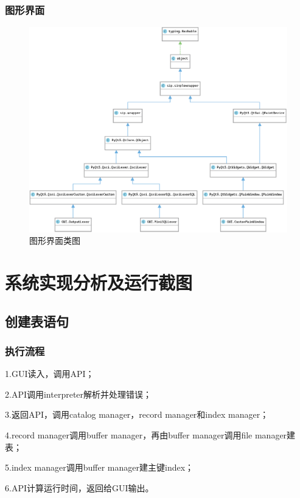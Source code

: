 \documentclass[UTF8]{ctexrep} %
\begin{document}
\subsection{图形界面}
\begin{figure}[H]
    \centering
    \includegraphics[width=\linewidth]{figure/gui_class.eps}
    \caption{图形界面类图}
    \label{fig:gui_class}
\end{figure}

\chapter{系统实现分析及运行截图}
\section{创建表语句}
\subsection{执行流程}
1.GUI读入，调用API；
\par
2.API调用interpreter解析并处理错误；
\par
3.返回API，调用catalog manager，record manager和index manager；
\par
4.record manager调用buffer manager，再由buffer manager调用file manager建表；
\par
5.index manager调用buffer manager建主键index；
\par
6.API计算运行时间，返回给GUI输出。
\end{document}
